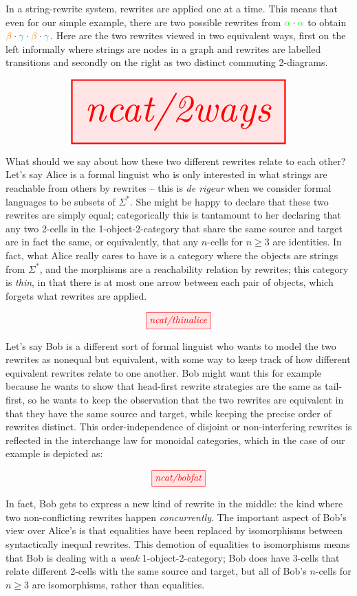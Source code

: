  In a string-rewrite system, rewrites are applied one at a time. This means that even for our simple example, there are two possible rewrites from $\textcolor{green}{\alpha} \cdot \textcolor{green}{\alpha}$ to obtain $\textcolor{orange}{\beta} \cdot \textcolor{cyan}{\gamma} \cdot \textcolor{orange}{\beta} \cdot \textcolor{cyan}{\gamma}$. Here are the two rewrites viewed in two equivalent ways, first on the left informally where strings are nodes in a graph and rewrites are labelled transitions and secondly on the right as two distinct commuting 2-diagrams.

\[\resizebox{0.8\textwidth}{!}{\tikzfig{ncat/2ways}}\]

What should we say about how these two different rewrites relate to each other? Let's say Alice is a formal linguist who is only interested in what strings are reachable from others by rewrites -- this is \emph{de rigeur} when we consider formal languages to be subsets of $\Sigma^*$. She might be happy to declare that these two rewrites are simply equal; categorically this is tantamount to her declaring that any two 2-cells in the 1-object-2-category that share the same source and target are in fact the same, or equivalently, that any $n$-cells for $n \geq 3$ are identities. In fact, what Alice really cares to have is a category where the objects are strings from $\Sigma^*$, and the morphisms are a reachability relation by rewrites; this category is \emph{thin}, in that there is at most one arrow between each pair of objects, which forgets what rewrites are applied.

\[\tikzfig{ncat/thinalice}\]

Let's say Bob is a different sort of formal linguist who wants to model the two rewrites as nonequal but equivalent, with some way to keep track of how different equivalent rewrites relate to one another. Bob might want this for example because he wants to show that head-first rewrite strategies are the same as tail-first, so he wants to keep the observation that the two rewrites are equivalent in that they have the same source and target, while keeping the precise order of rewrites distinct. This order-independence of disjoint or non-interfering rewrites is reflected in the interchange law for monoidal categories, which in the case of our example is depicted as:

\[\tikzfig{ncat/bobfat}\]

In fact, Bob gets to express a new kind of rewrite in the middle: the kind where two non-conflicting rewrites happen \emph{concurrently}. The important aspect of Bob's view over Alice's is that equalities have been replaced by isomorphisms between syntactically inequal rewrites. This demotion of equalities to isomorphisms means that Bob is dealing with a \emph{weak} 1-object-2-category; Bob does have 3-cells that relate different 2-cells with the same source and target, but all of Bob's $n$-cells for $n \geq 3$ are isomorphisms, rather than equalities.


